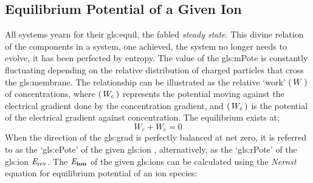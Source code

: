 \documentclass[class={myRUCProject}, crop=false]{standalone}
\begin{document}
\subsection{Equilibrium Potential of a Given Ion}
\begingroup
\allowdisplaybreaks
All systems yearn for their \gls{gls:equil}, the fabled \textit{steady state}. This divine relation of the components in a system, one achieved, the system no longer needs to evolve, it has been perfected by entropy. 
The value of the \gls{gls:mPote} is constantly fluctuating depending on the relative distribution of charged particles that cross the \gls{gls:membrane}. The relationship can be illustrated as the relative `work' \(\left(\,W\,\right)\) of concentrations, where  \(\left(\,W_c\,\right)\) represents the potential moving against the electrical gradient done by the concentration gradient, and \(\left(\,W_e\,\right)\) is the potential of the electrical gradient against concentration. The equilibrium exists at;
\begin{equation}
    W_e + W_c = 0
\end{equation}
When the direction of the \gls{gls:grad} is perfectly balanced at net zero, it is referred to as the `\gls{gls:ePote}' of the given \gls{gls:ion} \br{\equi\ion}, alternatively, as the `\gls{gls:rPote}' of the \gls{gls:ion} \(\mathit{E}_\mathrm{rev}\). 
The \(\mathit{E}_\mathbf{ion}\) of the given \glspl{gls:ion} can be calculated using the \emph{Nernst} equation for equilibrium potential of an ion species:
\end{document}
